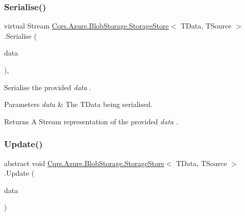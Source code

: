 \mbox{\label{classCqrs_1_1Azure_1_1BlobStorage_1_1StorageStore_a8e5d4e50e054d963f96aaa4808794718_a8e5d4e50e054d963f96aaa4808794718}} 
\subsubsection{\texorpdfstring{Serialise()}{Serialise()}}
{\footnotesize\ttfamily virtual Stream \hyperlink{classCqrs_1_1Azure_1_1BlobStorage_1_1StorageStore}{Cqrs.\+Azure.\+Blob\+Storage.\+Storage\+Store}$<$ T\+Data, T\+Source $>$.Serialise (\begin{DoxyParamCaption}\item[{T\+Data}]{data }\end{DoxyParamCaption})\hspace{0.3cm}{\ttfamily [protected]}, {\ttfamily [virtual]}}



Serialise the provided {\itshape data} . 


\begin{DoxyParams}{Parameters}
{\em data} & The T\+Data being serialised.\\
\hline
\end{DoxyParams}
\begin{DoxyReturn}{Returns}
A Stream representation of the provided {\itshape data} .
\end{DoxyReturn}
\mbox{\label{classCqrs_1_1Azure_1_1BlobStorage_1_1StorageStore_ae9ca8bfe30040f77e349a4d47b31da70_ae9ca8bfe30040f77e349a4d47b31da70}} 
\subsubsection{\texorpdfstring{Update()}{Update()}}
{\footnotesize\ttfamily abstract void \hyperlink{classCqrs_1_1Azure_1_1BlobStorage_1_1StorageStore}{Cqrs.\+Azure.\+Blob\+Storage.\+Storage\+Store}$<$ T\+Data, T\+Source $>$.Update (\begin{DoxyParamCaption}\item[{T\+Data}]{data }\end{DoxyParamCaption})\hspace{0.3cm}{\ttfamily [pure virtual]}}



